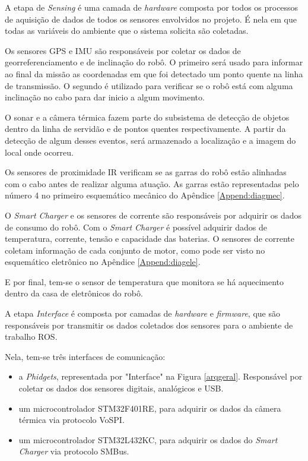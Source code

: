  A etapa de \textit{Sensing} é uma camada de \textit{hardware} composta por todos os processos de aquisição de dados de todos os sensores envolvidos no projeto. É nela em que todas as variáveis do ambiente que o sistema solicita são coletadas.
 
Os sensores GPS e IMU são responsáveis por coletar os dados de georreferenciamento e de inclinação do robô. O primeiro será usado para informar ao final da missão as coordenadas em que foi detectado um ponto quente na linha de transmissão. O segundo é utilizado para verificar se o robô está com alguma inclinação no cabo para dar inicio a algum movimento.

O sonar e a câmera térmica fazem parte do subsistema de detecção de objetos dentro da linha de servidão e de pontos quentes respectivamente. A partir da detecção de algum desses eventos, será armazenado a localização e a imagem do local onde ocorreu. 

Os sensores de proximidade IR verificam se as garras do robô estão alinhadas com o cabo antes de realizar alguma atuação. As garras estão representadas pelo número 4 no primeiro esquemático mecânico do Apêndice \ref{Append:diagmec}.

O \textit{Smart Charger} e os sensores de corrente são responsáveis por adquirir os dados de consumo do robô. Com o \textit{Smart Charger} é possível adquirir dados de temperatura, corrente, tensão e capacidade das baterias. O sensores de corrente coletam informação de cada conjunto de motor, como pode ser visto no esquemático eletrônico no Apêndice \ref{Append:diagele}.

E por final, tem-se o sensor de temperatura que monitora se há aquecimento dentro da casa de eletrônicos do robô.
  
A etapa \textit{Interface} é composta por camadas de \textit{hardware} e \textit{firmware}, que são responsáveis por transmitir os dados coletados dos sensores para o ambiente de trabalho ROS.

Nela, tem-se três interfaces de comunicação: 

\begin{itemize}
	\item a \textit{Phidgets}, representada por "Interface" na Figura \ref{arqgeral}. Responsável por coletar os dados dos sensores digitais, analógicos e USB.
	\item um microcontrolador STM32F401RE, para adquirir os dados da câmera térmica via protocolo VoSPI.
	\item um microcontrolador STM32L432KC, para adquirir os dados do \textit{Smart Charger} via protocolo SMBus.
\end{itemize}
 
